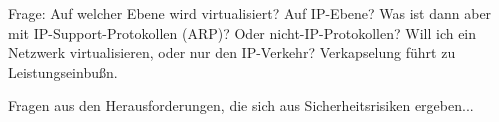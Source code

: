 \documentclass{lni}
\begin{document}
Frage: Auf welcher Ebene wird virtualisiert? Auf IP-Ebene? Was ist dann aber mit IP-Support-Protokollen (ARP)? Oder nicht-IP-Protokollen? Will ich ein Netzwerk virtualisieren, oder nur den IP-Verkehr? Verkapselung führt zu Leistungseinbußn. \cite{cabuk2007towards}

Fragen aus den Herausforderungen, die sich aus Sicherheitsrisiken ergeben...



\nocite{fischer2011position}


{}
\end{document}
